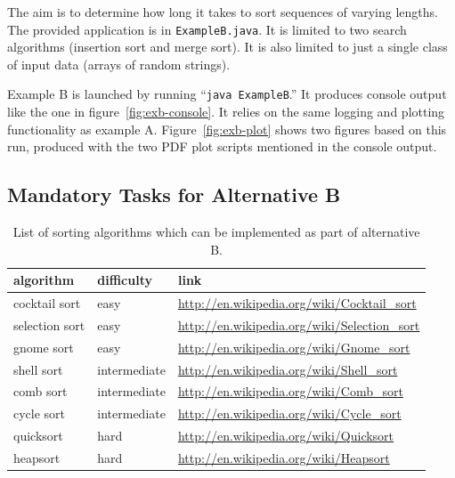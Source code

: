 \documentclass[a4paper,10pt]{article}
\begin{document}
The aim is to determine how long it takes to sort sequences of varying lengths.
The provided application is in \texttt{ExampleB.java}.
It is limited to two search algorithms (insertion sort and merge sort).
It is also limited to just a single class of input data (arrays of random strings).

Example B is launched by running ``\texttt{java ExampleB}.''
It produces console output like the one in figure~\ref{fig:exb-console}.
It relies on the same logging and plotting functionality as example A.
Figure~\ref{fig:exb-plot} shows two figures based on this run, produced with the two PDF plot scripts mentioned in the console output.



\subsection{Mandatory Tasks for Alternative B}\label{sec:task1b}

\begin{table}
  \centering
  \begin{tabular}{l|l|l}
    \textbf{algorithm} & \textbf{difficulty} & \textbf{link} \\
    \hline
    cocktail sort    & easy         & \url{http://en.wikipedia.org/wiki/Cocktail_sort} \\
    selection sort   & easy         & \url{http://en.wikipedia.org/wiki/Selection_sort} \\
    gnome sort       & easy         & \url{http://en.wikipedia.org/wiki/Gnome_sort} \\
    shell sort       & intermediate & \url{http://en.wikipedia.org/wiki/Shell_sort} \\
    comb sort        & intermediate & \url{http://en.wikipedia.org/wiki/Comb_sort} \\
    cycle sort       & intermediate & \url{http://en.wikipedia.org/wiki/Cycle_sort} \\
    quicksort        & hard         & \url{http://en.wikipedia.org/wiki/Quicksort} \\
    heapsort         & hard         & \url{http://en.wikipedia.org/wiki/Heapsort} \\

  \end{tabular}
  \caption{
    List of sorting algorithms which can be implemented as part of alternative B.
  }\label{tab:sorting-algorithms}
\end{table}
\end{document}
